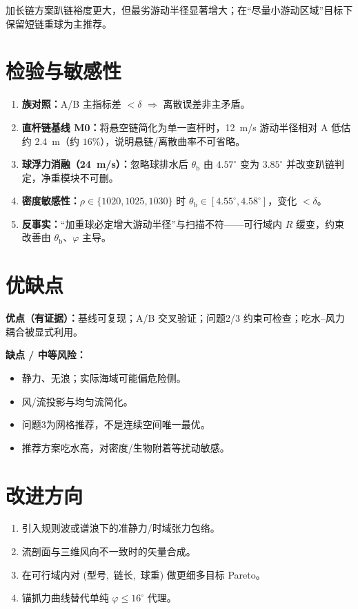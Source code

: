 \documentclass[UTF8,a4paper,12pt]{ctexart}
\begin{document}
加长链方案趴链裕度更大，但最劣游动半径显著增大；在“尽量小游动区域”目标下保留短链重球为主推荐。

\section{检验与敏感性}

\begin{enumerate}[leftmargin=1.5em]
  \item \textbf{族对照：}A/B 主指标差 \(<\delta\) \(\Rightarrow\) 离散误差非主矛盾。
  \item \textbf{直杆链基线 M0：}将悬空链简化为单一直杆时，\SI{12}{m/s} 游动半径相对 A 低估约 \SI{2.4}{m}（约 \(16\%\)），说明悬链/离散曲率不可省略。
  \item \textbf{球浮力消融（\SI{24}{m/s}）：}忽略球排水后 \(\theta_{\mathrm{b}}\) 由 \(4.57^\circ\) 变为 \(3.85^\circ\) 并改变趴链判定，净重模块不可删。
  \item \textbf{密度敏感性：}\(\rho\in\{1020,1025,1030\}\) 时 \(\theta_{\mathrm{b}}\in[4.55^\circ,4.58^\circ]\)，变化 \(<\delta\)。
  \item \textbf{反事实：}“加重球必定增大游动半径”与扫描不符——可行域内 \(R\) 缓变，约束改善由 \(\theta_{\mathrm{b}}\)、\(\varphi\) 主导。
\end{enumerate}

\section{优缺点}

\textbf{优点（有证据）：}基线可复现；A/B 交叉验证；问题2/3 约束可检查；吃水--风力耦合被显式利用。

\textbf{缺点 / 中等风险：}
\begin{itemize}[leftmargin=1.5em]
  \item 静力、无浪；实际海域可能偏危险侧。
  \item 风/流投影与均匀流简化。
  \item 问题3为网格推荐，不是连续空间唯一最优。
  \item 推荐方案吃水高，对密度/生物附着等扰动敏感。
\end{itemize}

\section{改进方向}

\begin{enumerate}[leftmargin=1.5em]
  \item 引入规则波或谱浪下的准静力/时域张力包络。
  \item 流剖面与三维风向不一致时的矢量合成。
  \item 在可行域内对 (型号,~链长,~球重) 做更细多目标 Pareto。
  \item 锚抓力曲线替代单纯 \(\varphi\le16^\circ\) 代理。
\end{enumerate}
\end{document}
